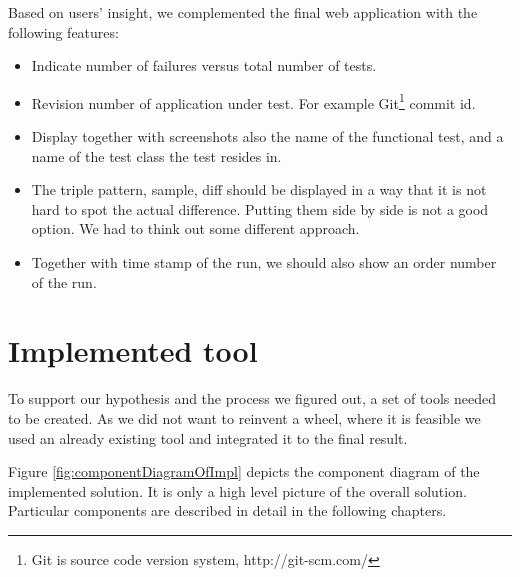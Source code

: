 \documentclass[11pt,oneside,final]{fithesis2}
\begin{document}
  Based on users' insight, we complemented the final web application with the following features:
  
  \begin{itemize}
   \item Indicate number of failures versus total number of tests.
   \item Revision number of application under test. For example Git\footnote{Git is source code version system, http://git-scm.com/}
   commit id.
   \item Display together with screenshots also the name of the functional test, and a name of the test class
   the test resides in.
   \item The triple pattern, sample, diff should be displayed in a way that it is not hard to spot the
   actual difference. Putting them side by side is not a good option. We had to think out some different
   approach.
   \item Together with time stamp of the run, we should also show an order number of the run.
  \end{itemize}

  
\chapter{Implemented tool}
To support our hypothesis and the process we figured out, a set of tools needed to be created. As we did
not want to reinvent a wheel, where it is feasible we used an already existing tool and integrated it to the
final result.

Figure \ref{fig:componentDiagramOfImpl} depicts the component diagram of the implemented solution. It is only a high
level picture of the overall solution. Particular components are described in detail in the following chapters.
\end{document}

